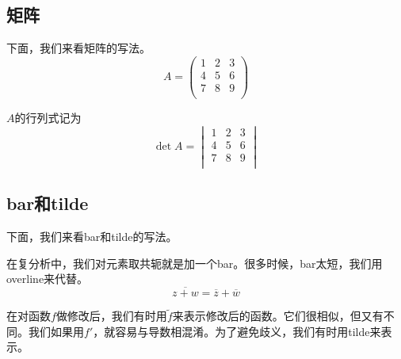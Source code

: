 \subsection{矩阵}
下面，我们来看矩阵的写法。
\[  A=\begin{pmatrix}
1&2&3\\
4&5&6\\
7&8&9\\
\end{pmatrix}\]

$A$的行列式记为
\[ \det A=\begin{vmatrix}
1&2&3\\
4&5&6\\
7&8&9\\
\end{vmatrix} \]

\subsection{bar和tilde}
下面，我们来看bar和tilde的写法。

在复分析中，我们对元素取共轭就是加一个bar。很多时候，bar太短，我们用overline来代替。
\[  \overline{z+w}=\overline{z}+\overline{w} \]

在对函数$f$做修改后，我们有时用$\tilde{f}$来表示修改后的函数。它们很相似，但又有不同。我们如果用$f'$，就容易与导数相混淆。为了避免歧义，我们有时用tilde来表示。







